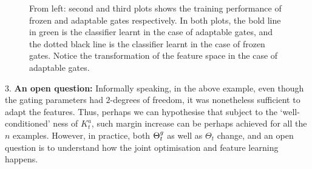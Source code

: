 \begin{figure}[h]
\caption{From left: second and third plots shows the training performance of frozen and adaptable gates respectively. In both plots, the bold line in green is the classifier learnt in the case of adaptable gates, and the dotted black line is the classifier learnt in the case of frozen gates. Notice the transformation of the feature space in the case of adaptable gates.}
\label{fig:feat}
\end{figure}
$3.$ \textbf{An open question:} Informally speaking, in the above example, even though the gating parameters had $2$-degrees of freedom, it was nonetheless sufficient to adapt the features. Thus, perhaps we can hypothesise that subject to the `well-conditioned' ness of $K^a_t$, such margin increase can be perhaps achieved for all the $n$ examples.  However, in practice, both ${\Theta}^g_t$ as well as $\Theta_t$ change, and an open question is to understand how the joint optimisation and feature learning happens. 